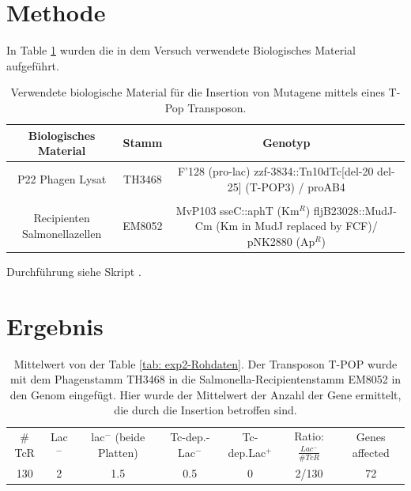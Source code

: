 \documentclass[oneside,10pt,a4paper]{report}
\begin{document}
		
		\section{Methode}
		
		In Table \ref{tab: exp2-biologisches Material} wurden die in dem Versuch verwendete Biologisches Material aufgeführt.
		
			\begin{table}[H]
			\centering
			\caption{Verwendete biologische Material für die Insertion von Mutagene mittels eines T-Pop Transposon.}
			\label{tab: exp2-biologisches Material}
			\begin{tabular}{ccc}
				\toprule
				Biologisches Material& Stamm & Genotyp\\
				\midrule
				\multirow{2}{*}{P22 Phagen Lysat} & \multirow{2}{*}{TH3468} & \multirow{2}{*}{\parbox[t]{9cm}{F’128 (pro-lac) zzf-3834::Tn10dTc[del-20 del-25] (T-POP3) / proAB4}}\\
				&&\\
				&&\\
				\multirow{3}{*}{\parbox[t]{3cm}{Recipienten Salmonellazellen}} & \multirow{3}{*}{EM8052} &\multirow{3}{*}{\parbox[t]{9cm}{MvP103 sseC::aphT (Km$^R$) fljB23028::MudJ-Cm (Km in MudJ replaced by FCF)/ pNK2880 (Ap$^R$)}} \\
				&&\\
				&&\\

				\bottomrule			
			\end{tabular}
		\end{table}

		Durchführung siehe Skript \cite{Mibi-Script}.
		
		\section{Ergebnis}
			\begin{table}[H]
			\centering
			\caption{Mittelwert von der Table \ref{tab: exp2-Rohdaten}. Der Transposon T-POP wurde mit dem Phagenstamm TH3468 in die Salmonella-Recipientenstamm EM8052 in den Genom eingefügt. Hier wurde der Mittelwert der Anzahl der Gene ermittelt, die durch die Insertion betroffen sind.}
			\label{tab: exp2-ergebnis}
			\begin{tabular}{ccccccc}
				\toprule
			\multirow{2}{*}{$\#$TcR} & \multirow{2}{*}{Lac$^-$}&\multirow{2}{*}{lac$^-$ (beide Platten)} & \multirow{2}{*}{Tc-dep.-Lac$^-$}& \multirow{2}{*}{Tc-dep.Lac$^+$}& \multirow{2}{*}{Ratio: $\frac{Lac^-}{\#TcR}$}&\multirow{2}{*}{\parbox[*]{1.2cm}{Genes affected}}\\
				&&&&&&\\
				\midrule
				130 & 2 & 1.5 & 0.5 & 0 & 2/130 & 72\\
				\bottomrule			
			\end{tabular}
		\end{table}
		
\end{document}
